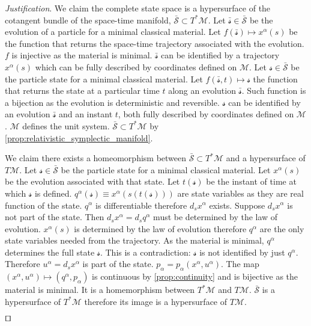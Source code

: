 \documentclass[smallextended]{svjour3}
\numberwithin{equation}{section}
\newenvironment{justification}{\emph{Justification}.}{\hfill\(\qed\)}
\theoremstyle{definition}
\newenvironment{justification}{\emph{Justification}.}{\qed}
\begin{document}
\begin{justification}
	We claim the complete state space is a hypersurface of the cotangent bundle of the space-time manifold, $\bar{\mathcal{S}} \subset T^*\mathcal{M}$. Let $\bar{\mathcal{s}} \in \bar{\mathcal{S}}$ be the evolution of a particle for a minimal classical material. Let $f(\bar{\mathcal{s}}) \mapsto x^\alpha(s)$ be the function that returns the space-time trajectory associated with the evolution. $f$ is injective as the material is minimal. $\bar{\mathcal{s}}$ can be identified by a trajectory $x^\alpha(s)$ which can be fully described by coordinates defined on $\mathcal{M}$. Let $\mathcal{s} \in \bar{\mathcal{S}}$ be the particle state for a minimal classical material. Let $f(\bar{\mathcal{s}}, t) \mapsto \mathcal{s}$ the function that returns the state at a particular time $t$ along an evolution $\bar{\mathcal{s}}$. Such function is a bijection as the evolution is deterministic and reversible. $\mathcal{s}$ can be identified by an evolution $\bar{\mathcal{s}}$ and an instant $t$, both fully described by coordinates defined on $\mathcal{M}$. $\mathcal{M}$ defines the unit system. $\bar{\mathcal{S}} \subset T^*\mathcal{M}$ by \ref{prop:relativistic_symplectic_manifold}.
	
	We claim there exists a homeomorphism between $\bar{\mathcal{S}} \subset T^*\mathcal{M}$ and a hypersurface of $T\mathcal{M}$. Let $\mathcal{s} \in \bar{\mathcal{S}}$ be the particle state for a minimal classical material. Let $x^\alpha(s)$ be the evolution associated with that state. Let $t(\mathcal{s})$ be the instant of time at which $\mathcal{s}$ is defined. $q^\alpha(\mathcal{s}) \equiv x^\alpha(s(t(\mathcal{s})))$ are state variables as they are real function of the state. $q^\alpha$ is differentiable therefore $d_s x^\alpha$ exists. Suppose $d_s x^\alpha$ is not part of the state. Then $d_s x^\alpha = d_s q^\alpha$ must be determined by the law of evolution. $x^\alpha(s)$ is determined by the law of evolution therefore $q^\alpha$ are the only state variables needed from the trajectory. As the material is minimal, $q^\alpha$ determines the full state $\mathcal{s}$. This is a contradiction: $\mathcal{s}$ is not identified by just $q^\alpha$. Therefore $u^\alpha=d_s x^\alpha$ is part of the state. $p_\alpha = p_\alpha(x^\alpha, u^\alpha)$. The map $(x^\alpha, u^\alpha) \mapsto (q^\alpha, p_\alpha)$ is continuous by \ref{prop:continuity} and is bijective as the material is minimal. It is a homemorphism between $T^*\mathcal{M}$ and $T\mathcal{M}$. $\bar{\mathcal{S}}$ is a hypersurface of $T^*\mathcal{M}$ therefore its image is a hypersurface of $T\mathcal{M}$.
	

\end{justification}
\end{document}
